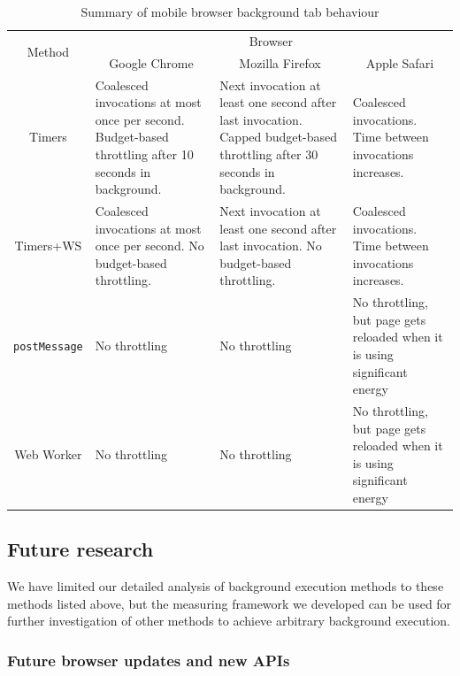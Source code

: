 \documentclass[article,type=bsc,colorback,accentcolor=tud9c]{tudthesis}
\begin{document}
  \begin{table}
    \centering
    \begin{tabular}{ c | p{} | p{} | p{} }
      \multirow{2}{*}{Method} & \multicolumn{3}{c}{Browser} \\
      \cline{2-4}
                              & \multicolumn{1}{|c|}{Google Chrome} & \multicolumn{1}{|c|}{Mozilla Firefox} & \multicolumn{1}{|c|}{Apple Safari} \\
      \hline
      Timers & Coalesced invocations at most once per second.
               Budget-based throttling after 10 seconds in background.
                              & Next invocation at least one second after last invocation.
                                Capped budget-based throttling after 30 seconds in background.
                              & Coalesced invocations. Time between invocations increases. \\
      \hline
      Timers+WS
                              & Coalesced invocations at most once per second. No budget-based throttling.
                              & Next invocation at least one second after last invocation. No budget-based throttling.
                              & Coalesced invocations. Time between invocations increases. \\
      \hline
      \texttt{postMessage}    & No throttling
                              & No throttling
                              & No throttling, but page gets reloaded when it is using significant energy \\
      \hline
      Web Worker              & No throttling
                              & No throttling
                              & No throttling, but page gets reloaded when it is using significant energy
    \end{tabular}
    \caption{Summary of mobile browser background tab behaviour}
    \label{tab:mobile-browser-background}
  \end{table}
 

  \subsection{Future research}

  We have limited our detailed analysis of background execution methods to these methods listed above, but the measuring framework we developed can be used for further investigation of other methods to achieve arbitrary background execution.

  \subsubsection{Future browser updates and new APIs}
\end{document}
